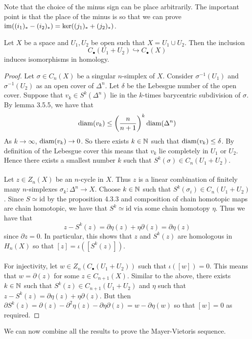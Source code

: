 \documentclass[a4paper]{article}
\begin{document}
Note that the choice of the minus sign can be place arbitrarily. The important point is that the place of the minus is so that we can prove $\operatorname{im}((i_1)_\ast-(i_2)_\ast)=\ker((j_1)_\ast+(j_2)_\ast)$. 

\begin{prp}{}{} Let $X$ be a space and $U_1,U_2$ be open such that $X=U_1\cup U_2$. Then the inclusion $$C_\bullet(U_1+U_2)\hookrightarrow C_\bullet(X)$$ induces isomorphisms in homology. \tcbline
\begin{proof}
Let $\sigma\in C_n(X)$ be a singular $n$-simplex of $X$. Consider $\sigma^{-1}(U_1)$ and $\sigma^{-1}(U_2)$ as an open cover of $\Delta^n$. Let $\delta$ be the Lebesgue number of the open cover. Suppose that $v_k\in S^k(\Delta^n)$ lie in the $k$-times barycentric subdivision of $\sigma$. By lemma 3.5.5, we have that $$\operatorname{diam}(v_k)\leq\left(\frac{n}{n+1}\right)^k\operatorname{diam}(\Delta^n)$$ As $k\to\infty$, $\operatorname{diam}(v_k)\to 0$. So there exists $k\in\mathbb{N}$ such that $\operatorname{diam}(v_k)\leq\delta$. By definition of the Lebesgue cover this means that $v_k$ lie completely in $U_1$ or $U_2$. Hence there exists a smallest number $k$ such that $S^k(\sigma)\in C_n(U_1+U_2)$. \\~\\

Let $z\in Z_n(X)$ be an $n$-cycle in $X$. Thus $z$ is a linear combination of finitely many $n$-simplexes $\sigma_k:\Delta^n\to X$. Choose $k\in\mathbb{N}$ such that $S^k(\sigma_i)\in C_n(U_1+U_2)$. Since $S\simeq\text{id}$ by the proposition 4.3.3 and composition of chain homotopic maps are chain homotopic, we have that $S^k\simeq\text{id}$ via some chain homotopy $\eta$. Thus we have that $$z-S^k(z)=\partial\eta(z)+\eta\partial(z)=\partial\eta(z)$$ since $\partial z=0$. In particular, this shows that $z$ and $S^k(z)$ are homologous in $H_n(X)$ so that $[z]=\iota([S^k(z)])$. \\~\\

For injectivity, let $w\in Z_n(C_\bullet(U_1+U_2))$ such that $\iota([w])=0$. This means that $w=\partial(z)$ for some $z\in C_{n+1}(X)$. Similar to the above, there exists $k\in\mathbb{N}$ such that $S^k(z)\in C_{n+1}(U_1+U_2)$ and $\eta$ such that $z-S^k(z)=\partial\eta(z)+\eta\partial(z)$. But then $\partial S^k(z)=\partial(z)-\partial^2\eta(z)-\partial\eta\partial(z)=w-\partial\eta(w)$ so that $[w]=0$ as required. 
\end{proof}
\end{prp}

We can now combine all the results to prove the Mayer-Vietoris sequence. 
\end{document}
